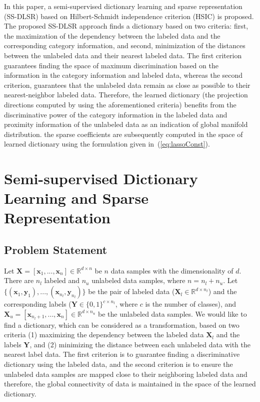 \documentclass{llncs}
\begin{document}
In this paper, a semi-supervised dictionary learning and sparse representation (SS-DLSR) based on Hilbert-Schmidt independence criterion (HSIC) is proposed. The proposed SS-DLSR approach finds a dictionary based on two criteria: first, the maximization of the dependency between the labeled data and the corresponding category information, and second, minimization of the distances between the unlabeled data and their nearest labeled data. The first criterion guarantees finding the space of maximum discrimination based on the information in the category information and labeled data, whereas the second criterion, guarantees that the unlabeled data remain as close as possible to their nearest-neighbor labeled data. Therefore, the learned dictionary (the projection directions computed by using the aforementioned criteria) benefits from the discriminative power of the category information in the labeled data and proximity information of the unlabeled data as an indication of global manifold distribution. the sparse coefficients are subsequently computed in the space of learned dictionary using the formulation given in~(\ref{eq:lassoConst}).

\section{Semi-supervised Dictionary Learning and Sparse Representation}
\label{sec:SSDL}

\subsection{Problem Statement}\label{subsec:problemStatement}

Let $\mathbf{X}=[\mathbf{x}_1,...,\mathbf{x}_n]\in\mathbb{R}^{d\times n}$ be $n$ data samples with the dimensionality of $d$. There are $n_l$ labeled and $n_u$ unlabeled data samples, where $n=n_l+n_u$. Let $\{(\mathbf{x}_1,\mathbf{y}_1),...,(\mathbf{x}_{n_l},\mathbf{y}_{n_l})\}$ be the pair of labeled data ($\mathbf{X}_l\in\mathbb{R}^{d\times n_l}$) and the corresponding labels ($\mathbf{Y}\in\{0,1\}^{c\times n_l}$, where $c$ is the number of classes), and $\mathbf{X}_u=[\mathbf{x}_{n_l+1},...,\mathbf{x}_n]\in\mathbb{R}^{d\times n_u}$ be the unlabeled data samples. We would like to find a dictionary, which can be considered as a transformation, based on two criteria (1) maximizing the dependency between the labeled data $\mathbf{X}_l$ and the labels $\mathbf{Y}$, and (2) minimizing the distance between each unlabeled data with the nearest label data. The first criterion is to guarantee finding a discriminative dictionary using the labeled data, and the second criterion is to ensure the unlabeled data samples are mapped close to their neighboring labeled data and therefore, the global connectivity of data is maintained in the space of the learned dictionary.
\end{document}
